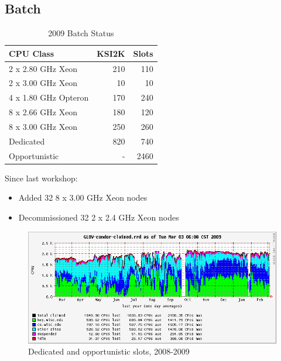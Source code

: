 \documentclass{beamer}
\begin{document}
\subsection{Batch}
\begin{frame}
\begin{table}
\begin{tabular}{lrr}
    \toprule
    CPU Class               &   KSI2K   &   Slots \\
    \midrule
    2 x 2.80 GHz Xeon       &   210     &   110 \\  %
    2 x 3.00 GHz Xeon       &   10      &   10 \\   %
    4 x 1.80 GHz Opteron    &   170     &   240 \\  %
    8 x 2.66 GHz Xeon       &   180     &   120 \\  %
    8 x 3.00 GHz Xeon       &   250     &   260 \\  %
    \midrule
    Dedicated               &   820     &   740 \\
    Opportunistic           &   -       &   2460 \\
    \bottomrule
\end{tabular}
\caption{2009 Batch Status}
\label{2009_batch_status}
\end{table}

Since last workshop:
\begin{itemize}
    \item Added 32 8 x 3.00 GHz Xeon nodes
    \item Decommissioned 32 2 x 2.4 GHz Xeon nodes
\end{itemize}
\end{frame}

\begin{frame}
\begin{figure}
    \includegraphics[width=\textwidth]{Graphics/GLOW-condor-claimed-1yr.png}
    \caption{Dedicated and opportunistic slots, 2008-2009}
\end{figure}
\end{frame}
\end{document}

